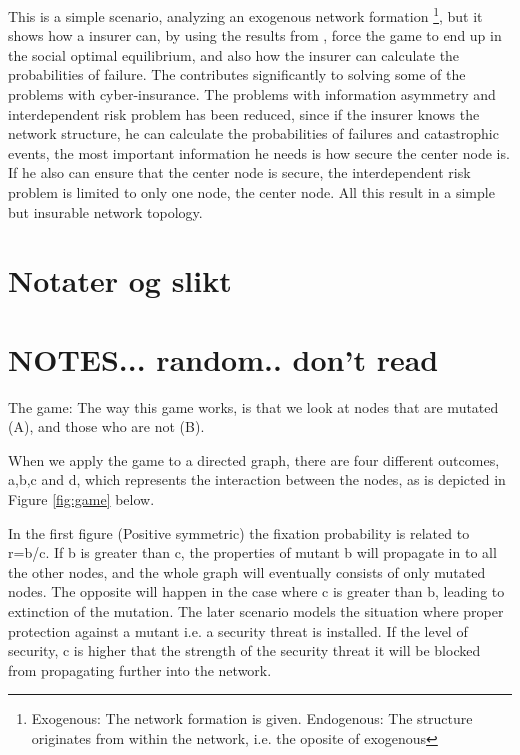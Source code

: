 This is a simple scenario, analyzing an exogenous network formation \footnote{Exogenous: The network formation is given. Endogenous: The structure originates from within the network, i.e. the oposite of exogenous}, 
but it shows how a insurer can, by using the results from \cite{lieberman2005evolutionary}, force the game to end up in the social optimal equilibrium, and also how the insurer can calculate the probabilities of failure. 
The contributes significantly to solving some of the problems with cyber-insurance. The problems with information asymmetry and interdependent risk problem has been reduced, since if the insurer knows the network structure, he can calculate the probabilities of failures and catastrophic events, the most important information he needs is how secure the center node is. If he also can ensure that the center node is secure, the interdependent risk problem is limited to only one node, the center node. All this result in a simple but insurable network topology.

   
\section{Notater og slikt}

\section{NOTES... random.. don't read}
 
The game:
The way this game works, is that we look at nodes that are mutated (A), and those who are not (B).  

When we apply the game to a directed graph, there are four different outcomes, a,b,c and d, which represents the interaction between the nodes, as is depicted in Figure \ref{fig:game} below. 

In the first figure (Positive symmetric) the fixation probability is related to r=b/c. If b is greater than c, the properties of mutant b will propagate in to all the other nodes, and the whole graph will eventually consists of only mutated nodes. The opposite will happen in the case where c is greater than b, leading to extinction of the mutation. The later scenario models the situation where proper protection against a mutant i.e. a security threat is installed. If the level of security, c is higher that the strength of the security threat it will be blocked from propagating further into the network. 


